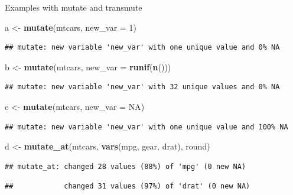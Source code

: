 \documentclass[
]{book}
\newenvironment{Shaded}{\begin{snugshade}}{\end{snugshade}}
\newcommand{\DataTypeTok}[1]{\textcolor[rgb]{0.13,0.29,0.53}{#1}}
\newcommand{\DecValTok}[1]{\textcolor[rgb]{0.00,0.00,0.81}{#1}}
\newcommand{\KeywordTok}[1]{\textcolor[rgb]{0.13,0.29,0.53}{\textbf{#1}}}
\newcommand{\NormalTok}[1]{#1}
\newcommand{\OtherTok}[1]{\textcolor[rgb]{0.56,0.35,0.01}{#1}}
\newcommand{\StringTok}[1]{\textcolor[rgb]{0.31,0.60,0.02}{#1}}
\begin{document}
Examples with mutate and transmute

\begin{Shaded}
\begin{Highlighting}[]
\NormalTok{a <-}\StringTok{ }\KeywordTok{mutate}\NormalTok{(mtcars, }\DataTypeTok{new_var =} \DecValTok{1}\NormalTok{)}
\end{Highlighting}
\end{Shaded}

\begin{verbatim}
## mutate: new variable 'new_var' with one unique value and 0% NA
\end{verbatim}

\begin{Shaded}
\begin{Highlighting}[]
\NormalTok{b <-}\StringTok{ }\KeywordTok{mutate}\NormalTok{(mtcars, }\DataTypeTok{new_var =} \KeywordTok{runif}\NormalTok{(}\KeywordTok{n}\NormalTok{()))}
\end{Highlighting}
\end{Shaded}

\begin{verbatim}
## mutate: new variable 'new_var' with 32 unique values and 0% NA
\end{verbatim}

\begin{Shaded}
\begin{Highlighting}[]
\NormalTok{c <-}\StringTok{ }\KeywordTok{mutate}\NormalTok{(mtcars, }\DataTypeTok{new_var =} \OtherTok{NA}\NormalTok{)}
\end{Highlighting}
\end{Shaded}

\begin{verbatim}
## mutate: new variable 'new_var' with one unique value and 100% NA
\end{verbatim}

\begin{Shaded}
\begin{Highlighting}[]
\NormalTok{d <-}\StringTok{ }\KeywordTok{mutate_at}\NormalTok{(mtcars, }\KeywordTok{vars}\NormalTok{(mpg, gear, drat), round)}
\end{Highlighting}
\end{Shaded}

\begin{verbatim}
## mutate_at: changed 28 values (88%) of 'mpg' (0 new NA)
\end{verbatim}

\begin{verbatim}
##            changed 31 values (97%) of 'drat' (0 new NA)
\end{verbatim}
\end{document}
